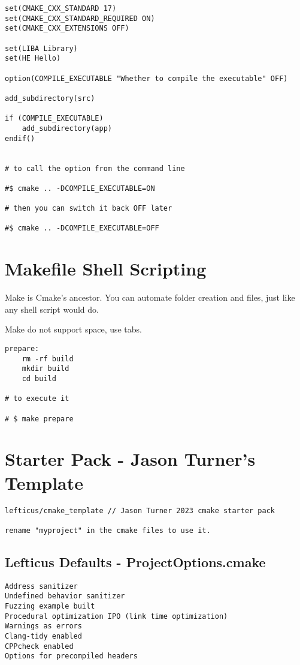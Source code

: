 \begin{verbatim}
set(CMAKE_CXX_STANDARD 17)
set(CMAKE_CXX_STANDARD_REQUIRED ON)
set(CMAKE_CXX_EXTENSIONS OFF)

set(LIBA Library)
set(HE Hello)

option(COMPILE_EXECUTABLE "Whether to compile the executable" OFF)

add_subdirectory(src)

if (COMPILE_EXECUTABLE)
    add_subdirectory(app)
endif()


# to call the option from the command line

#$ cmake .. -DCOMPILE_EXECUTABLE=ON

# then you can switch it back OFF later

#$ cmake .. -DCOMPILE_EXECUTABLE=OFF
\end{verbatim}


\section{Makefile Shell Scripting}

Make is Cmake's ancestor. You can automate folder creation and files, just like any shell script would do. 

Make do not support space, use tabs.

\begin{verbatim}
prepare:
    rm -rf build
    mkdir build
    cd build

# to execute it

# $ make prepare
\end{verbatim}


\section{Starter Pack - Jason Turner's Template}

\begin{verbatim}
lefticus/cmake_template // Jason Turner 2023 cmake starter pack

rename "myproject" in the cmake files to use it.
\end{verbatim}

\subsection{Lefticus Defaults - ProjectOptions.cmake}

\begin{verbatim}
Address sanitizer
Undefined behavior sanitizer
Fuzzing example built
Procedural optimization IPO (link time optimization)
Warnings as errors
Clang-tidy enabled
CPPcheck enabled
Options for precompiled headers
\end{verbatim}

